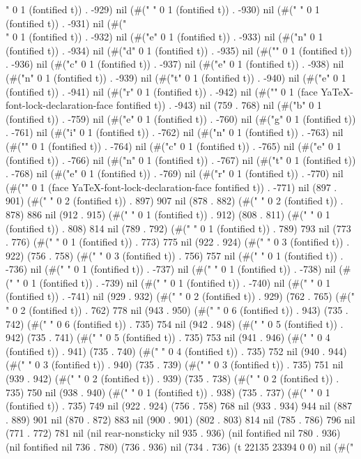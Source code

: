 " 0 1 (fontified t)) . -929) nil (#(" " 0 1 (fontified t)) . -930) nil (#(" " 0 1 (fontified t)) . -931) nil (#("\\" 0 1 (fontified t)) . -932) nil (#("e" 0 1 (fontified t)) . -933) nil (#("n" 0 1 (fontified t)) . -934) nil (#("d" 0 1 (fontified t)) . -935) nil (#("{" 0 1 (fontified t)) . -936) nil (#("c" 0 1 (fontified t)) . -937) nil (#("e" 0 1 (fontified t)) . -938) nil (#("n" 0 1 (fontified t)) . -939) nil (#("t" 0 1 (fontified t)) . -940) nil (#("e" 0 1 (fontified t)) . -941) nil (#("r" 0 1 (fontified t)) . -942) nil (#("}" 0 1 (face YaTeX-font-lock-declaration-face fontified t)) . -943) nil (759 . 768) nil (#("b" 0 1 (fontified t)) . -759) nil (#("e" 0 1 (fontified t)) . -760) nil (#("g" 0 1 (fontified t)) . -761) nil (#("i" 0 1 (fontified t)) . -762) nil (#("n" 0 1 (fontified t)) . -763) nil (#("{" 0 1 (fontified t)) . -764) nil (#("c" 0 1 (fontified t)) . -765) nil (#("e" 0 1 (fontified t)) . -766) nil (#("n" 0 1 (fontified t)) . -767) nil (#("t" 0 1 (fontified t)) . -768) nil (#("e" 0 1 (fontified t)) . -769) nil (#("r" 0 1 (fontified t)) . -770) nil (#("}" 0 1 (face YaTeX-font-lock-declaration-face fontified t)) . -771) nil (897 . 901) (#("  " 0 2 (fontified t)) . 897) 907 nil (878 . 882) (#("  " 0 2 (fontified t)) . 878) 886 nil (912 . 915) (#(" " 0 1 (fontified t)) . 912) (808 . 811) (#(" " 0 1 (fontified t)) . 808) 814 nil (789 . 792) (#(" " 0 1 (fontified t)) . 789) 793 nil (773 . 776) (#(" " 0 1 (fontified t)) . 773) 775 nil (922 . 924) (#("   " 0 3 (fontified t)) . 922) (756 . 758) (#("   " 0 3 (fontified t)) . 756) 757 nil (#(" " 0 1 (fontified t)) . -736) nil (#(" " 0 1 (fontified t)) . -737) nil (#(" " 0 1 (fontified t)) . -738) nil (#(" " 0 1 (fontified t)) . -739) nil (#(" " 0 1 (fontified t)) . -740) nil (#(" " 0 1 (fontified t)) . -741) nil (929 . 932) (#("  " 0 2 (fontified t)) . 929) (762 . 765) (#("  " 0 2 (fontified t)) . 762) 778 nil (943 . 950) (#("      " 0 6 (fontified t)) . 943) (735 . 742) (#("      " 0 6 (fontified t)) . 735) 754 nil (942 . 948) (#("     " 0 5 (fontified t)) . 942) (735 . 741) (#("     " 0 5 (fontified t)) . 735) 753 nil (941 . 946) (#("    " 0 4 (fontified t)) . 941) (735 . 740) (#("    " 0 4 (fontified t)) . 735) 752 nil (940 . 944) (#("   " 0 3 (fontified t)) . 940) (735 . 739) (#("   " 0 3 (fontified t)) . 735) 751 nil (939 . 942) (#("  " 0 2 (fontified t)) . 939) (735 . 738) (#("  " 0 2 (fontified t)) . 735) 750 nil (938 . 940) (#(" " 0 1 (fontified t)) . 938) (735 . 737) (#(" " 0 1 (fontified t)) . 735) 749 nil (922 . 924) (756 . 758) 768 nil (933 . 934) 944 nil (887 . 889) 901 nil (870 . 872) 883 nil (900 . 901) (802 . 803) 814 nil (785 . 786) 796 nil (771 . 772) 781 nil (nil rear-nonsticky nil 935 . 936) (nil fontified nil 780 . 936) (nil fontified nil 736 . 780) (736 . 936) nil (734 . 736) (t 22135 23394 0 0) nil (#("

